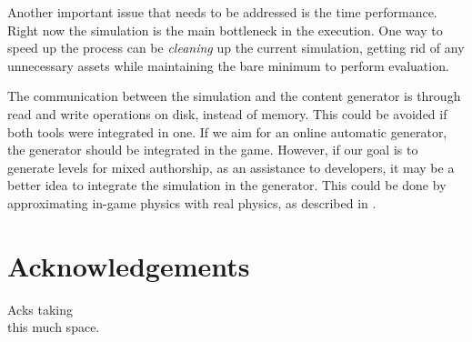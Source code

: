 \documentclass[runningheads,a4paper]{llncs}
\begin{document}




Another important issue that needs to be addressed is the time performance. 
Right now the simulation is the main bottleneck in the execution. One way to 
speed up the process can be \textit{cleaning} up the current simulation, getting 
rid of any unnecessary assets while maintaining the bare minimum to
perform evaluation. 

The communication between the simulation and the content generator is through 
read and write operations on disk, instead of memory. This could be avoided if 
both tools were integrated in one. If we aim for an online automatic generator, 
the generator should be integrated in the game. However, if our goal is to 
generate levels for mixed authorship, as an assistance to developers, it may be 
a better idea to integrate the simulation in the generator. This could be done 
by approximating in-game physics with real physics, as described in 
\cite{blum1970stability}. %



\section*{Acknowledgements}
Acks taking\\
this much space.



\end{document}
